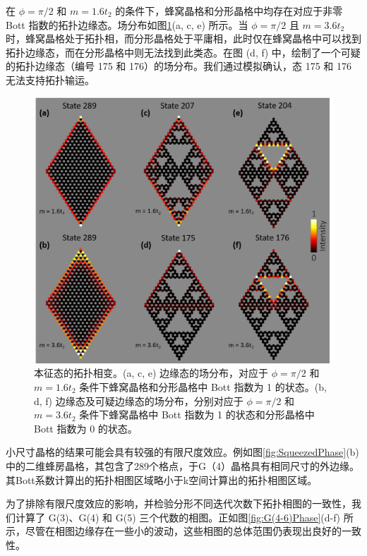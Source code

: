 在 $\phi = \pi/2$ 和 $m = 1.6t_2$ 的条件下，蜂窝晶格和分形晶格中均存在对应于非零 Bott 指数的拓扑边缘态。场分布如图\ref{fig:TransitionEdge}(a, c, e) 所示。当 $\phi = \pi/2$ 且 $m = 3.6t_2$ 时，蜂窝晶格处于拓扑相，而分形晶格处于平庸相，此时仅在蜂窝晶格中可以找到拓扑边缘态，而在分形晶格中则无法找到此类态。在图 (d, f) 中，绘制了一个可疑的拓扑边缘态（编号 175 和 176）的场分布。我们通过模拟确认，态 175 和 176 无法支持拓扑输运。

\begin{figure}[htbp]
    \centering
    \includegraphics[width=0.75\linewidth]{figure/FracHaldTheo/TransitionEdge.png}
    \caption{本征态的拓扑相变。(a, c, e) 边缘态的场分布，对应于 $\phi = \pi/2$ 和 $m = 1.6t_2$ 条件下蜂窝晶格和分形晶格中 Bott 指数为 1 的状态。(b, d, f) 边缘态及可疑边缘态的场分布，分别对应于 $\phi = \pi/2$ 和 $m = 3.6t_2$ 条件下蜂窝晶格中 Bott 指数为 1 的状态和分形晶格中 Bott 指数为 0 的状态。}
    \label{fig:TransitionEdge}
\end{figure}

小尺寸晶格的结果可能会具有较强的有限尺度效应。例如图\ref{fig:SqueezedPhase}(b)中的二维蜂房晶格，其包含了289个格点，于G（4）晶格具有相同尺寸的外边缘。其Bott系数计算出的拓扑相图区域略小于k空间计算出的拓扑相图区域。

为了排除有限尺度效应的影响，并检验分形不同迭代次数下拓扑相图的一致性，我们计算了 G(3)、G(4) 和 G(5) 三个代数的相图。正如图\ref{fig:G(4-6)Phase}(d-f) 所示，尽管在相图边缘存在一些小的波动，这些相图的总体范围仍表现出良好的一致性。

